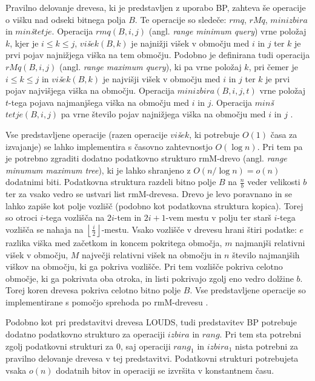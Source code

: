 Pravilno delovanje drevesa, ki je predstavljen z uporabo BP, zahteva še operacije o višku nad odseki bitnega polja $B$. Te operacije so sledeče: $rmq$, $rMq$, $minizbira$ in $min$\textit{š}$tetje$. Operacija $rmq(B,i,j)$ (angl. \textit{range minimum query}) vrne položaj $k$, kjer je $i\le k\le j$, $vi$\textit{š}$ek(B,k)$ je najnižji višek v območju med $i$ in $j$ ter $k$ je prvi pojav najnižjega viška na tem območju. Podobno je definirana tudi operacija $rMq(B,i,j)$ (angl. \textit{range maximum query}), ki pa vrne položaj $k$, pri čemer je $i\le k\le j$ in $vi$\textit{š}$ek(B,k)$ je najvišji višek v območju med $i$ in $j$ ter $k$ je prvi pojav najvišjega viška na območju. Operacija $minizbira(B,i,j,t)$ vrne položaj $t$-tega pojava najmanjšega viška na območju med $i$ in $j$. Operacija $min$\textit{š}$tetje(B,i,j)$ pa vrne število pojav najnižjega viška na območju med $i$ in $j$ \cite{Navarro2016}.

Vse predstavljene operacije (razen operacije $vi$\textit{š}$ek$, ki potrebuje $O(1)$ časa za izvajanje) se lahko implementira s časovno zahtevnostjo $O(\log{n})$. Pri tem pa je potrebno zgraditi dodatno podatkovno strukturo rmM-drevo (angl. \textit{range minumum maximum tree}), ki je lahko shranjeno z $O(n/\log{n})=o(n)$ dodatnimi biti. Podatkovna struktura razdeli bitno polje $B$ na $\frac{n}{b}$ veder velikosti $b$ ter za vsako vedro se ustvari list rmM-drevesa. Drevo je levo poravnano in se lahko zapiše kot polje vozlišč (podobno kot podatkovna struktura kopica). Torej so otroci $i$-tega vozlišča na $2i$-tem in $2i+1$-vem mestu v polju ter starš $i$-tega vozlišča se nahaja na $\left\lfloor\frac{i}{2}\right\rfloor$-mestu. Vsako vozlišče v drevesu hrani štiri podatke: $e$ razlika viška med začetkom in koncem pokritega območja, $m$ najmanjši relativni višek v območju, $M$ največji relativni višek na območju in $n$ število najmanjših viškov na območju, ki ga pokriva vozlišče. Pri tem vozlišče pokriva celotno območje, ki ga pokrivata oba otroka, in listi pokrivajo zgolj eno vedro dolžine $b$. Torej koren drevesa pokriva celotno bitno polje $B$. Vse predstavljene operacije so implementirane s pomočjo sprehoda po rmM-drevesu 
\cite{Navarro2016}.

Podobno kot pri predstavitvi drevesa LOUDS, tudi predstavitev BP potrebuje dodatno podatkovno strukturo za operaciji $izbira$ in $rang$. Pri tem sta potrebni zgolj podatkovni strukturi za $0$, saj  operaciji $rang_1$ in $izbira_1$ nista potrebni za pravilno delovanje drevesa v tej predstavitvi. Podatkovni strukturi potrebujeta vsaka $o(n)$ dodatnih bitov in operaciji se izvršita v konstantnem času.

